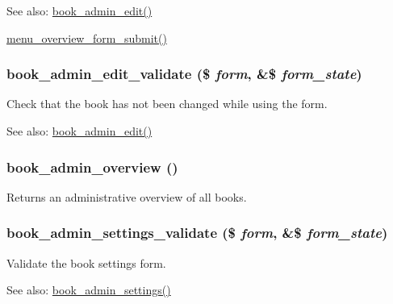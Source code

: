 \begin{Desc}
\item[See also:]\hyperlink{group__forms_g3add8d3b6439de3883a30986428fdc87}{book\_\-admin\_\-edit()} 

\hyperlink{menu_8admin_8inc_a16576d9e19529ee9f710dc3b5f5b810}{menu\_\-overview\_\-form\_\-submit()} \end{Desc}
\hypertarget{book_8admin_8inc_e92ff3db1b9b0f3a9832e1db72d5faec}{
\subsubsection[{book\_\-admin\_\-edit\_\-validate}]{\setlength{\rightskip}{0pt plus 5cm}book\_\-admin\_\-edit\_\-validate (\$ {\em form}, \/  \&\$ {\em form\_\-state})}}
\label{book_8admin_8inc_e92ff3db1b9b0f3a9832e1db72d5faec}


Check that the book has not been changed while using the form.

\begin{Desc}
\item[See also:]\hyperlink{group__forms_g3add8d3b6439de3883a30986428fdc87}{book\_\-admin\_\-edit()} \end{Desc}
\hypertarget{book_8admin_8inc_8157d71732b3c171a9328b73059f2716}{
\subsubsection[{book\_\-admin\_\-overview}]{\setlength{\rightskip}{0pt plus 5cm}book\_\-admin\_\-overview ()}}
\label{book_8admin_8inc_8157d71732b3c171a9328b73059f2716}


Returns an administrative overview of all books. \hypertarget{book_8admin_8inc_18c68be0c946b1fdf59bed35fc266d60}{
\subsubsection[{book\_\-admin\_\-settings\_\-validate}]{\setlength{\rightskip}{0pt plus 5cm}book\_\-admin\_\-settings\_\-validate (\$ {\em form}, \/  \&\$ {\em form\_\-state})}}
\label{book_8admin_8inc_18c68be0c946b1fdf59bed35fc266d60}


Validate the book settings form.

\begin{Desc}
\item[See also:]\hyperlink{group__forms_g036f1d2ed17d79b71545c955c864cf2e}{book\_\-admin\_\-settings()} \end{Desc}
